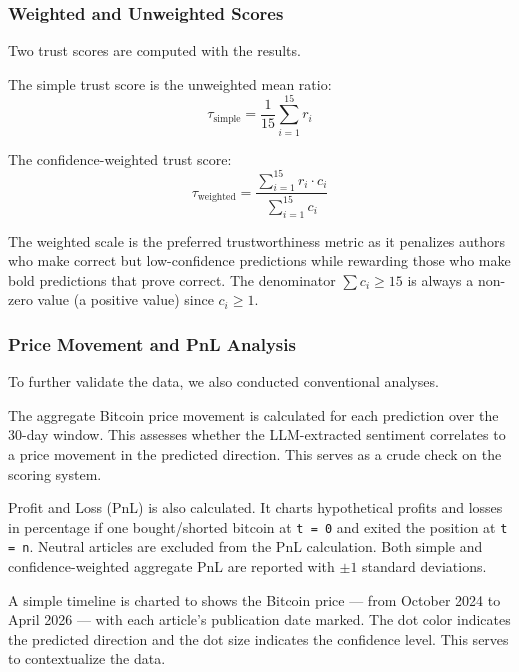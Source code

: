 \documentclass[sigconf,screen]{acmart}
\begin{document}
\subsubsection{Weighted and Unweighted Scores}

Two trust scores are computed with the results.

The simple trust score is the unweighted mean ratio:
\begin{equation}
\tau_{\text{simple}} = \frac{1}{15} \sum_{i=1}^{15} r_i
\end{equation}

The confidence-weighted trust score:
\begin{equation}
\tau_{\text{weighted}} =
\frac{\sum_{i=1}^{15} r_i \cdot c_i}{\sum_{i=1}^{15} c_i}
\end{equation}

The weighted scale is the preferred trustworthiness metric as it penalizes authors who make correct but low-confidence predictions while rewarding those who make bold predictions that prove correct. The denominator $\sum c_i \geq 15$ is always a non-zero value (a positive value) since $c_i \geq 1$.

\subsubsection{Price Movement and PnL Analysis}
 
To further validate the data, we also conducted conventional analyses.
 
The aggregate Bitcoin price movement is calculated for each prediction over the 30-day window. This assesses whether the LLM-extracted sentiment correlates to a price movement in the predicted direction. This serves as a crude check on the scoring system.
 
Profit and Loss (PnL) is also calculated. It charts hypothetical profits and losses in percentage if one bought/shorted bitcoin at \texttt{t = 0} and exited the position at \texttt{t = n}. Neutral articles are excluded from the PnL calculation. Both simple and confidence-weighted aggregate PnL are reported with $\pm1$ standard deviations.
 
A simple timeline is charted to shows the Bitcoin price --- from October 2024 to April 2026 --- with each article's publication date marked. The dot color indicates the predicted direction and the dot size indicates the confidence level. This serves to contextualize the data.
\end{document}
